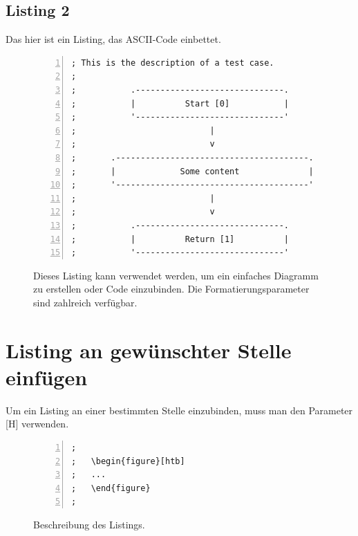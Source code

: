 \subsection{Listing 2}
\label{subsec:Listing 2}

Das hier ist ein Listing, das ASCII-Code einbettet.

\FloatBarrier
\begin{figure}[htb]
\begin{lstlisting}[backgroundcolor={\color{white}},
basicstyle={\normalsize\sffamily},
breaklines=true,
frame={bottomline,topline, rightline},
language=HTML,
numbers=left,
showstringspaces=false,
xleftmargin=22pt]	
; This is the description of a test case.
;
;           .------------------------------.
;           |          Start [0]           |
;           '------------------------------'
;                           |
;                           v
;       .---------------------------------------.
;       |             Some content		        |
;       '---------------------------------------'
;                           |
;                           v
;           .------------------------------.
;           |          Return [1]          |
;           '------------------------------'
\end{lstlisting}
  \caption[Ein Listing inklusive Zeilennummern]{Dieses Listing kann verwendet werden, um ein einfaches Diagramm zu erstellen oder Code einzubinden. Die Formatierungsparameter sind zahlreich verfügbar.}
\label{lst:Diagramm}
\end{figure}




\section{Listing an gewünschter Stelle einfügen}
\label{sec:FigurHierEinfuegen}
Um ein Listing an einer bestimmten Stelle einzubinden, muss man den Parameter [H] verwenden.

\FloatBarrier
\begin{figure}[htb]
\begin{lstlisting}[backgroundcolor={\color{white}},
basicstyle={\normalsize\sffamily},
breaklines=true,
frame={bottomline,topline, rightline},
language=HTML,
numbers=left,
showstringspaces=false,
xleftmargin=22pt]	
; 
;	\begin{figure}[htb]
;	...
;	\end{figure}
;
\end{lstlisting}
  \caption{Beschreibung des Listings.}
\label{lst:FigurGenauHier}
\end{figure}



